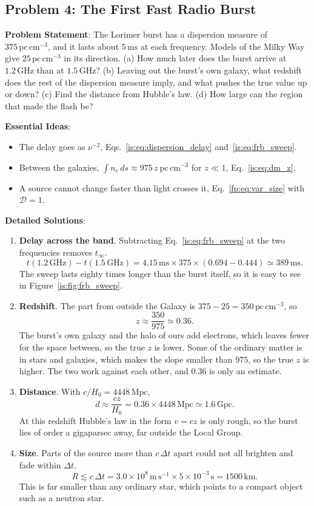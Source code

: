 \subsection{Problem 4: The First Fast Radio Burst}
\label{is:prob:frb}

\textbf{Problem Statement}: The Lorimer burst has a dispersion measure of $375\,\mathrm{pc\,cm^{-3}}$, and it lasts about $5\,\mathrm{ms}$ at each frequency. Models of the Milky Way give $25\,\mathrm{pc\,cm^{-3}}$ in its direction. (a) How much later does the burst arrive at $1.2\,\mathrm{GHz}$ than at $1.5\,\mathrm{GHz}$? (b) Leaving out the burst's own galaxy, what redshift does the rest of the dispersion measure imply, and what pushes the true value up or down? (c) Find the distance from Hubble's law. (d) How large can the region that made the flash be?

\textbf{Essential Ideas}:
\begin{itemize}
	\item The delay goes as $\nu^{-2}$, Eqs.~\eqref{is:eq:dispersion_delay} and~\eqref{is:eq:frb_sweep}.
	\item Between the galaxies, $\int n_e\,ds\approx975\,z\ \mathrm{pc\,cm^{-3}}$ for $z\ll1$, Eq.~\eqref{is:eq:dm_z}.
	\item A source cannot change faster than light crosses it, Eq.~\eqref{fp:eq:var_size} with $\mathcal D=1$.
\end{itemize}

\textbf{Detailed Solutions}:
\begin{enumerate}[label=(\alph*)]
	\item \textbf{Delay across the band}. Subtracting Eq.~\eqref{is:eq:frb_sweep} at the two frequencies removes $t_\infty$.
	\[
	\boxed{t(1.2\,\mathrm{GHz})-t(1.5\,\mathrm{GHz})=4.15\,\mathrm{ms}\times375\times(0.694-0.444)\simeq389\,\mathrm{ms}.}
	\]
	The sweep lasts eighty times longer than the burst itself, so it is easy to see in Figure~\ref{is:fig:frb_sweep}.
	\item \textbf{Redshift}. The part from outside the Galaxy is $375-25=350\,\mathrm{pc\,cm^{-3}}$, so
	\[
	\boxed{z\approx\frac{350}{975}\simeq0.36.}
	\]
	The burst's own galaxy and the halo of ours add electrons, which leaves fewer for the space between, so the true $z$ is lower. Some of the ordinary matter is in stars and galaxies, which makes the slope smaller than $975$, so the true $z$ is higher. The two work against each other, and $0.36$ is only an estimate.
	\item \textbf{Distance}. With $c/H_0=4448\,\mathrm{Mpc}$,
	\[
	\boxed{d\approx\frac{cz}{H_0}=0.36\times4448\,\mathrm{Mpc}\simeq1.6\,\mathrm{Gpc}.}
	\]
	At this redshift Hubble's law in the form $v=cz$ is only rough, so the burst lies of order a gigaparsec away, far outside the Local Group.
	\item \textbf{Size}. Parts of the source more than $c\,\Delta t$ apart could not all brighten and fade within $\Delta t$.
	\[
	\boxed{R\lesssim c\,\Delta t=3.0\times10^8\,\mathrm{m\,s^{-1}}\times5\times10^{-3}\,\mathrm s=1500\,\mathrm{km}.}
	\]
	This is far smaller than any ordinary star, which points to a compact object such as a neutron star.
\end{enumerate}
